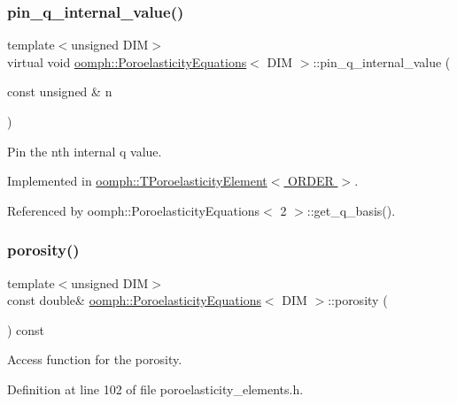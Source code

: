 \subsubsection{\texorpdfstring{pin\+\_\+q\+\_\+internal\+\_\+value()}{pin\_q\_internal\_value()}}
{\footnotesize\ttfamily template$<$unsigned D\+IM$>$ \\
virtual void \hyperlink{classoomph_1_1PoroelasticityEquations}{oomph\+::\+Poroelasticity\+Equations}$<$ D\+IM $>$\+::pin\+\_\+q\+\_\+internal\+\_\+value (\begin{DoxyParamCaption}\item[{const unsigned \&}]{n }\end{DoxyParamCaption})\hspace{0.3cm}{\ttfamily [pure virtual]}}



Pin the nth internal q value. 



Implemented in \hyperlink{classoomph_1_1TPoroelasticityElement_a47d4f048c1120647968b844927db7877}{oomph\+::\+T\+Poroelasticity\+Element$<$ O\+R\+D\+E\+R $>$}.



Referenced by oomph\+::\+Poroelasticity\+Equations$<$ 2 $>$\+::get\+\_\+q\+\_\+basis().

\mbox{\label{classoomph_1_1PoroelasticityEquations_a09ec2c09c5c41a732523ccb9f8869fa0}} 
\subsubsection{\texorpdfstring{porosity()}{porosity()}}
{\footnotesize\ttfamily template$<$unsigned D\+IM$>$ \\
const double\& \hyperlink{classoomph_1_1PoroelasticityEquations}{oomph\+::\+Poroelasticity\+Equations}$<$ D\+IM $>$\+::porosity (\begin{DoxyParamCaption}{ }\end{DoxyParamCaption}) const\hspace{0.3cm}{\ttfamily [inline]}}



Access function for the porosity. 



Definition at line 102 of file poroelasticity\+\_\+elements.\+h.

